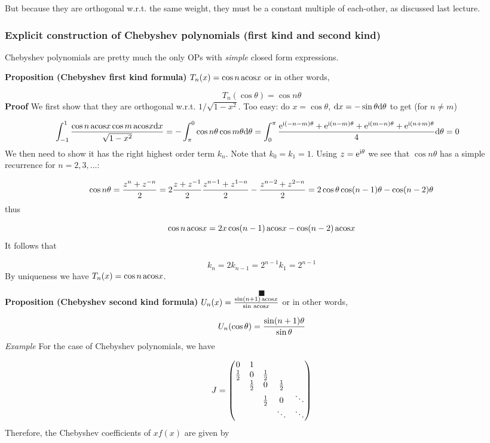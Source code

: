 \documentclass[12pt,a4paper]{article}
\begin{document}
But because they are orthogonal w.r.t. the same weight, they must be a constant multiple of each-other, as discussed last lecture.

\subsubsection{Explicit construction of Chebyshev polynomials (first kind and second kind)}
Chebyshev polynomials are pretty much the only OPs with \emph{simple} closed form expressions.

\textbf{Proposition (Chebyshev first kind formula)} $T_n(x) = \cos n\, {\rm acos} x$ or in other words,

\[
T_n(\cos \theta) = \cos n \theta
\]
\textbf{Proof} We first show that they are orthogonal w.r.t. $1/\sqrt{1-x^2}$. Too easy: do $x = \cos \theta$, ${\rm d}x = -\sin \theta {\rm d}\theta$ to get (for $n \neq m$)


\begin{align*}
    \int_{-1}^1 {\cos n\, {\rm acos}x \cos m \, {\rm acos}x  {\rm d}x \over \sqrt{1-x^2}} &= -\int_\pi^0  \cos n \theta \cos m \theta {\rm d} \theta 
    =  \int_0^\pi  {{\rm e}^{{\rm i} (-n-m)\theta} + {\rm e}^{{\rm i} (n-m)\theta} + {\rm e}^{{\rm i} (m-n)\theta} + {\rm e}^{{\rm i} (n+m)\theta}    \over 4} {\rm d} \theta =0
\end{align*}
We then need to show it has the right highest order term $k_n$. Note that $k_0 = k_1 = 1$.  Using $z = {\rm e}^{{\rm i} \theta}$ we see that $\cos n \theta$ has a simple recurrence for $n=2,3,\ldots$:

\[
\cos n \theta = {z^n + z^{-n} \over 2} = 2 {z + z^{-1} \over 2} {z^{n-1} + z^{1-n} \over 2}- {z^{n-2} + z^{2-n} \over 2} =
2 \cos \theta \cos (n-1)\theta - \cos(n-2)\theta
\]
thus

\[
\cos n\, {\rm acos}x = 2 x \cos(n-1) \, {\rm acos}x - \cos(n-2)\, {\rm acos}x
\]
It follows that

\[
k_n = 2  k_{n-1} = 2^{n-1} k_1 = 2^{n-1}
\]
By uniqueness we have $T_n(x) = \cos n\, {\rm acos}x$.

\[
\blacksquare
\]
\textbf{Proposition (Chebyshev second kind formula)} $U_n(x) = {\sin (n+1) \, {\rm acos} x \over \sin \, {\rm acos} x}$ or in other words,

\[
U_n(\cos \theta) = {\sin (n+1) \theta \over \sin \theta}
\]
\emph{Example} For the case of Chebyshev polynomials, we have

\[
J = \begin{pmatrix}
0 & 1 \cr
{1\over 2} & 0 & {1\over 2}\cr
& {1\over 2} & 0 & {1\over 2} \cr
&& {1\over 2} & 0 & \ddots \cr
&&&\ddots & \ddots
\end{pmatrix}
\]
Therefore, the Chebyshev coefficients of $x f(x)$ are given by
\end{document}
